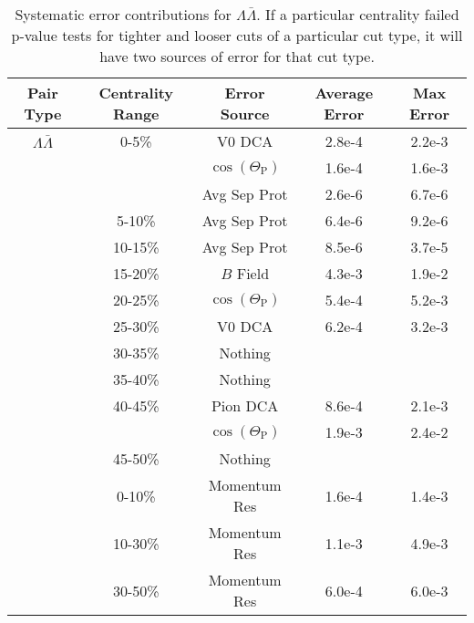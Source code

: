 \begin{table}
\caption[Systematic error contributions for $\Lambda\bar{\Lambda}$] {Systematic error contributions for $\Lambda\bar{\Lambda}$.  
If a particular centrality failed p-value tests for tighter and looser cuts of a particular cut type, it will have two sources of error for that cut type.} \label{tab:SysErrorSourcesLA} 
\begin{center}
\begin{tabular}{| c | c | c | c | c |}
  \hline                        
  Pair Type & Centrality Range & Error Source & Average Error & Max Error \\
  \hline  
  $\Lambda\bar{\Lambda}$ &  0-5\% & V0 DCA & 2.8e-4 & 2.2e-3 \\
   &         & $\cos(\Theta_{\mathrm{P}})$ & 1.6e-4 & 1.6e-3 \\
   &         & Avg Sep Prot & 2.6e-6 & 6.7e-6 \\
   & 5-10\%  & Avg Sep Prot & 6.4e-6 & 9.2e-6 \\
   & 10-15\% & Avg Sep Prot & 8.5e-6 & 3.7e-5 \\
   & 15-20\% & $B$ Field & 4.3e-3 & 1.9e-2 \\
   & 20-25\% & $\cos(\Theta_{\mathrm{P}})$ & 5.4e-4 & 5.2e-3 \\
   & 25-30\% & V0 DCA & 6.2e-4 & 3.2e-3 \\
   & 30-35\% & Nothing & &  \\
   & 35-40\% & Nothing & &  \\
   & 40-45\% & Pion DCA & 8.6e-4 & 2.1e-3  \\
   &         & $\cos(\Theta_{\mathrm{P}})$ & 1.9e-3 & 2.4e-2 \\
   & 45-50\% & Nothing & &  \\
   & 0-10\%  & Momentum Res & 1.6e-4 & 1.4e-3 \\
   & 10-30\% & Momentum Res & 1.1e-3 & 4.9e-3 \\
   & 30-50\% & Momentum Res & 6.0e-4 & 6.0e-3 \\
  \hline  
\end{tabular}
\end{center}
\end{table}

